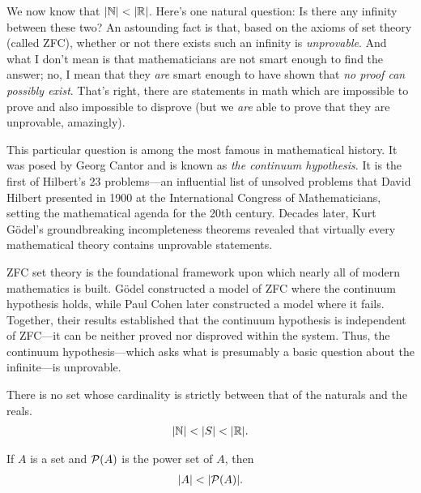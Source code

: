 \begin{remark}
  We now know that $| \mathbb N | < | \mathbb R |$. Here's one natural
  question: Is there any infinity between these two? An astounding
  fact is that, based on the axioms of set theory (called ZFC),
  whether or not there exists such an infinity is
  \textit{unprovable}. And what I don't mean is that mathematicians
  are not smart enough to find the answer; no, I mean that they
  \textit{are} smart enough to have shown that \textit{no proof can
  possibly exist}. That's right, there are statements in math which
  are impossible to prove and also impossible to disprove (but we
  \textit{are} able to prove that they are unprovable, amazingly).

  This particular question is among the most famous in mathematical
  history. It was posed by Georg Cantor and is known as \textit{the
  continuum hypothesis}. It is the first of Hilbert's 23 problems—an
  influential list of unsolved problems that David Hilbert presented
  in 1900 at the International Congress of Mathematicians, setting
  the mathematical agenda for the 20th century. Decades later, Kurt
  Gödel's groundbreaking incompleteness theorems revealed that
  virtually every mathematical theory contains unprovable statements.

  ZFC set theory is the foundational framework upon which nearly all
  of modern mathematics is built. Gödel constructed a model of ZFC
  where the continuum hypothesis holds, while Paul Cohen later
  constructed a model where it fails. Together, their results
  established that the continuum hypothesis is independent of
  ZFC---it can be neither proved nor disproved within the system.
  Thus, the continuum hypothesis---which asks what is presumably a
  basic question about the infinite---is unprovable.
\end{remark}

\begin{hypothesis}
  There is no set whose cardinality is strictly between that of the
  naturals and the reals.
  \begin{align*}
    | \mathbb N | < | S | < | \mathbb R |.
  \end{align*}
\end{hypothesis}

\begin{theorem}
  If $A$ is a set and $\mathcal{P}(A)$ is the power set of $A$, then
  \begin{align*}
    | A | < | \mathcal{P}(A) |.
  \end{align*}
\end{theorem}

